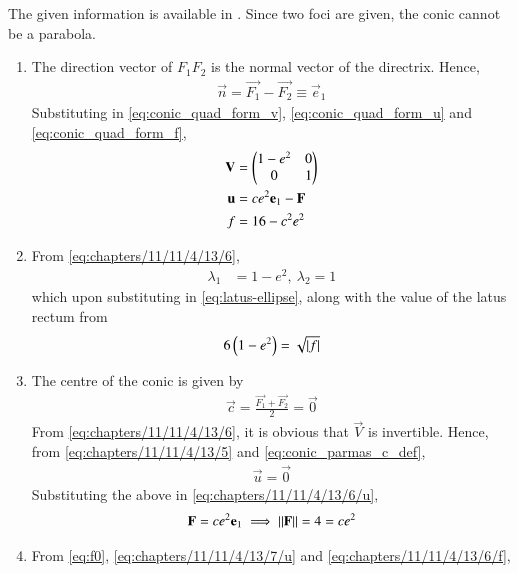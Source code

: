 The given information is available in 
.
Since two foci are given, the conic cannot be a parabola.
\begin{enumerate}
\item The direction vector of $F_1F_2$ is the normal vector of the directrix.  Hence, 
\begin{align}
\vec{n} = \vec{F_1} - \vec{F_2}
	\equiv \vec{e}_1
\end{align}
Substituting in 
  \eqref{eq:conic_quad_form_v},
\eqref{eq:conic_quad_form_u}
and
\eqref{eq:conic_quad_form_f},
\begin{align}
	\mathbf{V} &= \begin{pmatrix}1-e^2&0\\0&1\end{pmatrix} \label{eq:chapters/11/11/4/13/6} 
	\\
	\mathbf{u} &= ce^2\mathbf{e}_1-\mathbf{F}
\label{eq:chapters/11/11/4/13/6/u} 
	\\
	f&=16-c^2e^2
\label{eq:chapters/11/11/4/13/6/f} 
\end{align}
\item From
\eqref{eq:chapters/11/11/4/13/6},
\begin{align}
\lambda_1 &= 1-e^2,\
\lambda_2 = 1
\label{eq:chapters/11/11/4/13/12}
\end{align}
which upon substituting
in
			\eqref{eq:latus-ellipse}, along with the value of the latus rectum 
from \tabref{tab:chapters/11/11/4/13/1}
		\begin{align}
	6\left(1-e^2\right) = \sqrt{\left\vert f\right\vert}
\label{eq:chapters/11/11/4/13/12/f}
\end{align}
\item  The centre of the conic is given by
\begin{align}
\vec{c} = \frac{\vec{F_1} + \vec{F_2}}{2}
= \vec{0}
\label{eq:chapters/11/11/4/13/5}
\end{align}
From \eqref{eq:chapters/11/11/4/13/6}, it is obvious that  
$\vec{V}$ is invertible.  Hence,  
from \eqref{eq:chapters/11/11/4/13/5}
and 
\eqref{eq:conic_parmas_c_def},
\begin{align}
\vec{u} = \vec{0}
	\label{eq:chapters/11/11/4/13/7/u}
\end{align}
Substituting the above in \eqref{eq:chapters/11/11/4/13/6/u}, 
\begin{align}
\mathbf{F} = ce^2\mathbf{e}_1 
\implies 
	\left\lVert\mathbf{F}\right\rVert = 4 = ce^2
	\label{eq:chapters/11/11/4/13/7}
\end{align}
\item 
	From 
      \eqref{eq:f0}, 
	\eqref{eq:chapters/11/11/4/13/7/u}
and
\eqref{eq:chapters/11/11/4/13/6/f},

\end{enumerate}
